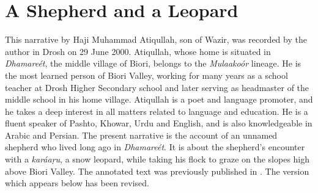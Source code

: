 \appendix
{}

\section*{A Shepherd and a Leopard}

This narrative by Haji Muhammad Atiqullah, son of Wazir, was recorded by the author in Drosh on 29 June 2000. Atiqullah, whose home is situated in \textit{Dhamareét}, the middle village of Biori, belongs to the \textit{Mulaakoór} lineage. He is the most learned person of Biori Valley, working for many years as a school teacher at Drosh Higher Secondary school and later serving as headmaster of the middle school in his home village. Atiqullah is a poet and language promoter, and he takes a deep interest in all matters related to language and education. He is a fluent speaker of Pashto, Khowar, Urdu and English, and is also knowledgeable in Arabic and Persian. The present narrative is the account of an unnamed shepherd who lived long ago in \textit{Dhamareét}. It is about the shepherd’s encounter with a \textit{karáaṛu}, a snow leopard, while taking his flock to graze on the slopes high above Biori Valley. The annotated text was previously published in \citet[182--187]{liljegrenhaider2015}. The version which appears below has been revised.

